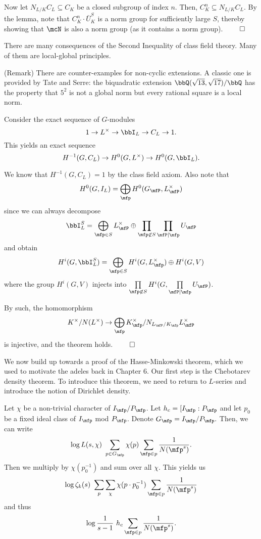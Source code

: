 \documentclass[a4paper, 12pt,oneside,openany]{book}
\begin{document}
Now let $N_{L/K}C_L \subseteq C_K$ be a closed subgroup of index $n$. Then, $C_K^n \subseteq N_{L/K}C_L$. By the lemma, note that $C_K^n \cdot \bar{U}_K^S$ is a norm group for sufficiently large $S$, thereby showing that $\mcN$ is also a norm group (as it contains a norm group). $\qed$

There are many consequences of the Second Inequality of class field theory. Many of them are local-global principles.


(Remark) There are counter-examples for non-cyclic extensions. A classic one is provided by Tate and Serre: the biquadratic extension $\bbQ(\sqrt{13}, \sqrt{17})/\bbQ$ has the property that $5^2$ is not a global norm but every rational square is a local norm.

 Consider the exact sequence of $G$-modules $$1 \to L^\times \to \bbI_L \to C_L \to 1.$$ This yields an exact sequence $$H^{-1}(G, C_L) \to H^0(G, L^\times) \to H^0(G, \bbI_L).$$

We know that $H^{-1}(G, C_L)=1$ by the class field axiom. Also note that $$H^0(G, I_L) = \bigoplus\limits_\mfp H^0(G_\mfP, L_\mfP^\times)$$ since we can always decompose $$\bbI_L^S = \bigoplus\limits_{\mfp \in S}  L_\mfP^\times \oplus \prod\limits_{\mfp \not\in S} \prod\limits_{\mfP \mid \mfp} U_\mfP$$ and obtain $$H^i(G, \bbI_L^S) = \bigoplus_{\mfp \in S} H^i(G, L_\mfp^\times) \oplus H^i(G, V)$$ where the group $H^i(G, V)$ injects into $\prod\limits_{\mfp \not\in S} H^i(G, \prod\limits_{\mfP \mid \mfp} U_\mfP)$.

By such, the homomorphism $$K^\times / N(L^\times) \to\bigoplus\limits_\mfp K^\times_\mfp / N_{L_\mfP/K_\mfp} L_\mfP^\times$$ is injective, and the theorem holds. $\qed$

We now build up towards a proof of the Hasse-Minkowski theorem, which we used to motivate the adeles back in Chapter 6. Our first step is the Chebotarev density theorem. To introduce this theorem, we need to return to $L$-series and introduce the notion of Dirichlet density. 

Let $\chi$ be a non-trivial character of $I_\mfp / P_\mfp$. Let $h_c = [I_\mfp : P_\mfp$ and let $p_0$ be a fixed ideal class of $I_\mfp$ mod $P_\mfp$. Denote $G_\mfp = I_\mfp/P_\mfp.$ Then, we can write $$\log L(s, \chi) ~ \sum\limits_{p \in G_\mfp} \chi(p) \sum\limits_{\mfp \in p} \frac{1}{N(\mfp^s)}.$$ Then we multiply by $\chi(p_0^{-1})$ and sum over all $\chi$. This yields us $$\log \zeta_k(s) ~ \sum\limits_p \sum\limits_\chi \chi(p\cdot p_0^{-1}) \sum\limits_{\mfp \in p} \frac{1}{N(\mfp^s)}$$ and thus $$\log \frac{1}{s-1} ~ h_c \sum\limits_{\mfp \in p} \frac{1}{N(\mfp^s)}.$$
\end{document}
